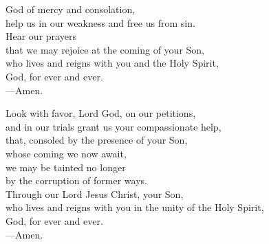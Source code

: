 \prayer


\begin{prayerverse}
God of mercy and consolation,\\
help us in our weakness and free us from sin.\\
Hear our prayers\\
that we may rejoice at the coming of your Son,\\
who lives and reigns with you and the Holy Spirit,\\
God, for ever and ever.\\
{\color{red}---\thinspace}Amen.
\end{prayerverse}


\begin{prayerverse}
Look with favor, Lord God, on our petitions,\\
and in our trials grant us your compassionate help,\\
that, consoled by the presence of your Son,\\
whose coming we now await,\\
we may be tainted no longer\\
by the corruption of former ways.\\
Through our Lord Jesus Christ, your Son,\\
who lives and reigns with you in the unity of the Holy Spirit,\\
God, for ever and ever.\\
{\color{red}---\thinspace}Amen.
\end{prayerverse}

